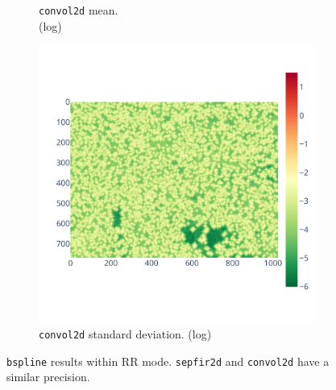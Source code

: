 \documentclass[11pt]{article}
\newcommand{\tristan}[1]{\color{orange}\textbf{From Tristan:} #1\color{black}\xspace}
\begin{document}
\begin{figure}
\begin{subfigure}{0.3\linewidth}
    \caption{\centering\texttt{convol2d} mean. \\ (log)}
    \label{fig:bspline_convol2d_mean}
\end{subfigure}
\begin{subfigure}{0.3\linewidth}
    \includegraphics[width=\linewidth]{figure/bspline/convol2d_std_log.pdf}
    \caption{\centering\texttt{convol2d} standard deviation. (log)}
    \label{fig:bspline_convol2d_std}
\end{subfigure}
    \caption{\texttt{bspline} results within RR mode. \texttt{sepfir2d} and
 \texttt{convol2d} have a similar precision.
    }
    \label{fig:bspline_rr}
\end{figure}
\end{document}
